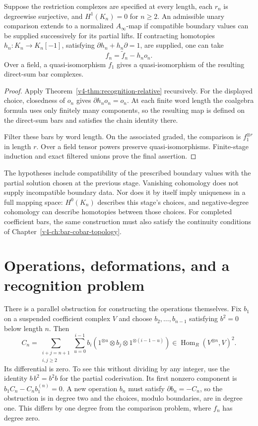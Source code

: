 \begin{corollary}
\label{v4-cor:recognition-all-lengths}
Suppose the restriction complexes are specified at every length,
each \(r_n\) is degreewise surjective, and \(H^1(K_n)=0\)
for \(n\geq2\). An admissible unary comparison extends to a
normalized \(A_\infty\)-map if compatible boundary values can
be supplied successively for its partial lifts. If contracting homotopies
\(h_n:K_n\to K_n[-1]\), satisfying
\(\partial h_n+h_n\partial=1\), are supplied, one can take
\[
 f_n=\widetilde f_n-h_no_n.
\]
Over a field, a quasi-isomorphism \(f_1\) gives a
quasi-isomorphism of the resulting direct-sum bar complexes.
\end{corollary}

\begin{proof}
Apply Theorem~\ref{v4-thm:recognition-relative} recursively. For
the displayed choice, closedness of \(o_n\) gives
\(\partial h_no_n=o_n\). At each finite word length the
coalgebra formula uses only finitely many components, so the
resulting map is defined on the direct-sum bars and satisfies
the chain identity there.

Filter these bars by word length. On the associated graded, the
comparison is \(f_1^{\otimes r}\) in length \(r\). Over a
field tensor powers preserve quasi-isomorphisms. Finite-stage
induction and exact filtered unions prove the final assertion.
\end{proof}

The hypotheses include compatibility of the prescribed boundary
values with the partial solution chosen at the previous stage.
Vanishing cohomology does not supply incompatible boundary data.
Nor does it by itself imply uniqueness in a full mapping space:
\(H^0(K_n)\) describes this stage's choices, and negative-degree
cohomology can describe homotopies between those choices. For
completed coefficient bars, the same construction must also
satisfy the continuity conditions of
Chapter~\ref{v4-ch:bar-cobar-topology}.

\section{Operations, deformations, and a recognition problem}
\label{v4-sec:recognition-deformations}

There is a parallel obstruction for constructing the operations
themselves. Fix \(b_1\) on a suspended coefficient complex \(V\)
and choose \(b_2,\ldots,b_{n-1}\) satisfying \(b^2=0\) below
length \(n\). Then
\[
 C_n=\sum_{\substack{i+j=n+1\\i,j\geq2}}
       \sum_{u=0}^{i-1}
       b_i(1^{\otimes u}\otimes b_j\otimes1^{\otimes(i-1-u)})
       \in\operatorname{Hom}_R(V^{\otimes n},V)^2.
\]
Its differential is zero. To see this without dividing by any
integer, use the identity \(b\,b^2=b^2b\) for the partial
coderivation. Its first nonzero component is
\(b_1C_n-C_nb_1^{(n)}=0\). A new operation \(b_n\) must
satisfy \(\partial b_n=-C_n\), so the obstruction is in
degree two and the choices, modulo boundaries, are in degree
one. This differs by one degree from the comparison problem,
where \(f_n\) has degree zero.

